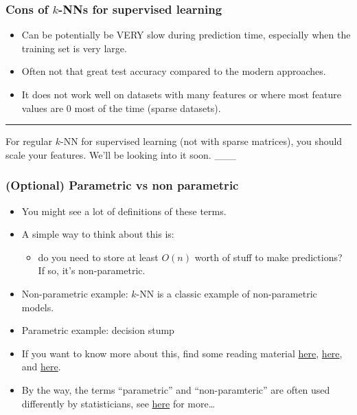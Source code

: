 \documentclass[11pt]{article}
\providecommand{\tightlist}{%
      \setlength{\itemsep}{0pt}\setlength{\parskip}{0pt}}
\begin{document}
    \subsubsection{\texorpdfstring{Cons of \(k\)-NNs for supervised
learning}{Cons of k-NNs for supervised learning}}\label{cons-of-k-nns-for-supervised-learning}

\begin{itemize}
\tightlist
\item
  Can be potentially be VERY slow during prediction time, especially
  when the training set is very large.
\item
  Often not that great test accuracy compared to the modern approaches.
\item
  It does not work well on datasets with many features or where most
  feature values are 0 most of the time (sparse datasets).
\end{itemize}

    \begin{center}\rule{0.5\linewidth}{0.5pt}\end{center}

For regular \(k\)-NN for supervised learning (not with sparse matrices),
you should scale your features. We'll be looking into it soon. \_\_\_

    \subsubsection{(Optional) Parametric vs non
parametric}\label{optional-parametric-vs-non-parametric}

\begin{itemize}
\tightlist
\item
  You might see a lot of definitions of these terms.
\item
  A simple way to think about this is:

  \begin{itemize}
  \tightlist
  \item
    do you need to store at least \(O(n)\) worth of stuff to make
    predictions? If so, it's non-parametric.
  \end{itemize}
\item
  Non-parametric example: \(k\)-NN is a classic example of
  non-parametric models.\\
\item
  Parametric example: decision stump
\item
  If you want to know more about this, find some reading material
  \href{https://www.cs.ubc.ca/~schmidtm/Courses/340-F16/L6.pdf}{here},
  \href{http://mlss.tuebingen.mpg.de/2015/slides/ghahramani/gp-neural-nets15.pdf}{here},
  and
  \href{https://machinelearningmastery.com/parametric-and-nonparametric-machine-learning-algorithms/}{here}.
\item
  By the way, the terms ``parametric'' and ``non-paramteric'' are often
  used differently by statisticians, see
  \href{https://help.xlstat.com/s/article/what-is-the-difference-between-a-parametric-and-a-nonparametric-test?language=en_US}{here}
  for more\ldots{}
\end{itemize}
\end{document}
